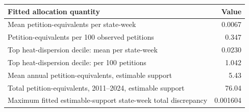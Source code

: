 \begin{tabular}{lr}
\toprule
Fitted allocation quantity & Value \\
\midrule
Mean petition-equivalents per state-week & 0.0067 \\
Petition-equivalents per 100 observed petitions & 0.347 \\
Top heat-dispersion decile: mean per state-week & 0.0230 \\
Top heat-dispersion decile: per 100 petitions & 1.042 \\
Mean annual petition-equivalents, estimable support & 5.43 \\
Total petition-equivalents, 2011--2024, estimable support & 76.04 \\
Maximum fitted estimable-support state-week total discrepancy & 0.001604 \\
\bottomrule
\end{tabular}
